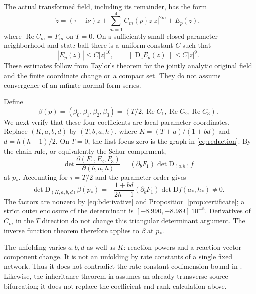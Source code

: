 \documentclass[11pt,a4paper]{article}
\theoremstyle{remark}
\newcommand{\ii}{\mathrm i}
\newcommand{\Rea}{\operatorname{Re}}
\newcommand{\D}{\mathrm D}
\numberwithin{equation}{section}
\begin{document}
The actual transformed field, including its remainder, has the form
\begin{equation}\label{eq:fullnf}
 \dot z=(\tau+\ii\nu)z+\sum_{m=1}^4 C_m(p)z|z|^{2m}+E_p(z),
\end{equation}
where $\Rea C_m=F_m$ on $T=0$. On a sufficiently small closed
parameter neighborhood and state ball there is a uniform constant $C$
such that
\begin{equation}\label{eq:remainder}
 |E_p(z)|\leq C|z|^{10},\qquad
 \|\D_zE_p(z)\|\leq C|z|^9.
\end{equation}
These estimates follow from Taylor's theorem for the jointly analytic
original field and the finite coordinate change on a compact set.
They do not assume convergence of an infinite normal-form series.

Define
\begin{equation}\label{eq:beta}
 \beta(p)=(\beta_0,\beta_1,\beta_2,\beta_3)
      =(T/2,\Rea C_1,\Rea C_2,\Rea C_3).
\end{equation}
We next verify that these four coefficients are local parameter
coordinates. Replace $(K,a,b,d)$ by $(T,b,a,h)$, where
$K=(T+a)/(1+bd)$ and $d=h(h-1)/2$. On $T=0$, the first-focus
zero is the graph in \eqref{eq:reduction}. By the chain rule, or
equivalently the Schur complement,
\begin{equation}\label{eq:schur}
 \det\frac{\partial(F_1,F_2,F_3)}{\partial(b,a,h)}
   = (\partial_bF_1)\det\D_{(a,h)} f
\end{equation}
at $p_*$. Accounting for $\tau=T/2$ and the parameter order gives
\begin{equation}\label{eq:fullrank}
 \det\D_{(K,a,b,d)}\beta(p_*)
 =-\frac{1+bd}{2h-1}(\partial_bF_1)\det\D f(a_*,h_*)\ne0.
\end{equation}
The factors are nonzero by \eqref{eq:bderivative} and
Proposition~\ref{prop:certificate}; a strict outer enclosure of the
determinant is $[-8.990,-8.989]\,10^{-8}$. Derivatives of $C_m$ in
the $T$ direction do not change this triangular determinant argument.
The inverse function theorem therefore applies to $\beta$ at $p_*$.

The unfolding varies $a,b,d$ as well as $K$: reaction powers and a
reaction-vector component change. It is not an unfolding by rate
constants of a single fixed network. Thus it does not contradict the
rate-constant codimension bound in
\cite[Theorem~35]{BanajiBorosHofbauer2024}. Likewise, the inheritance
theorem in \cite[Theorem~3.2]{BanajiBorosHofbauer2025} assumes an already
transverse source bifurcation; it does not replace the coefficient and
rank calculation above.
\end{document}

